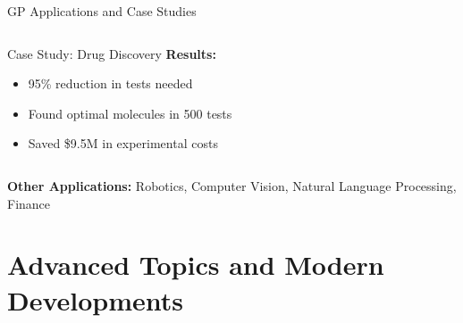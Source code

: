 \documentclass[aspectratio=169,11pt]{beamer}
\begin{document}
\begin{frame}{GP Applications and Case Studies}
\begin{columns}
\begin{column}{0.5\textwidth}
\begin{block}{Case Study: Drug Discovery}
\textbf{Results:}
\begin{itemize}
\item 95\% reduction in tests needed
\item Found optimal molecules in 500 tests
\item Saved \$9.5M in experimental costs
\end{itemize}
\end{block}
\end{column}
\end{columns}

\vspace{0.3cm}
\textbf{Other Applications:} Robotics, Computer Vision, Natural Language Processing, Finance
\end{frame}

\section{Advanced Topics and Modern Developments}
\end{document}
